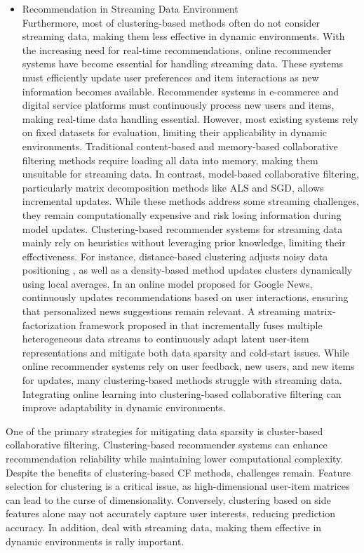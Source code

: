 \documentclass{article}
\begin{document}
\begin{itemize}
\item[c) ] Recommendation in Streaming Data Environment \\
Furthermore, most of clustering-based methods often do not consider streaming data, making them less effective in dynamic environments. With the increasing need for real-time recommendations, online recommender systems have become essential for handling streaming data. These systems must efficiently update user preferences and item interactions as new information becomes available. Recommender systems in e-commerce and digital service platforms must continuously process new users and items, making real-time data handling essential. However, most existing systems rely on fixed datasets for evaluation, limiting their applicability in dynamic environments. Traditional content-based and memory-based collaborative filtering methods require loading all data into memory, making them unsuitable for streaming data. In contrast, model-based collaborative filtering, particularly matrix decomposition methods like ALS and SGD, allows incremental updates. While these methods address some streaming challenges, they remain computationally expensive and risk losing information during model updates. Clustering-based recommender systems for streaming data mainly rely on heuristics without leveraging prior knowledge, limiting their effectiveness. For instance, distance-based clustering adjusts noisy data positioning \cite{georgieva2008dynamic}, as well as a density-based method updates clusters dynamically using local averages\cite{baruah2012evolving}. In \cite{das2007google} an online model proposed for Google News, continuously updates recommendations based on user interactions, ensuring that personalized news suggestions remain relevant. A streaming matrix‐factorization framework proposed in \cite{jakomin2020simultaneous} that incrementally fuses multiple heterogeneous data streams to continuously adapt latent user‐item representations and mitigate both data sparsity and cold‐start issues. While online recommender systems rely on user feedback, new users, and new items for updates, many clustering-based methods struggle with streaming data. Integrating online learning into clustering-based collaborative filtering can improve adaptability in dynamic environments.
\end{itemize}

One of the primary strategies for mitigating data sparsity is cluster-based collaborative filtering. Clustering-based recommender systems can enhance recommendation reliability while maintaining lower computational complexity. Despite the benefits of clustering-based CF methods, challenges remain. Feature selection for clustering is a critical issue, as high-dimensional user-item matrices can lead to the curse of dimensionality. Conversely, clustering based on side features alone may not accurately capture user interests, reducing prediction accuracy. In addition, deal with streaming data, making them effective in dynamic environments is rally important.
\end{document}
